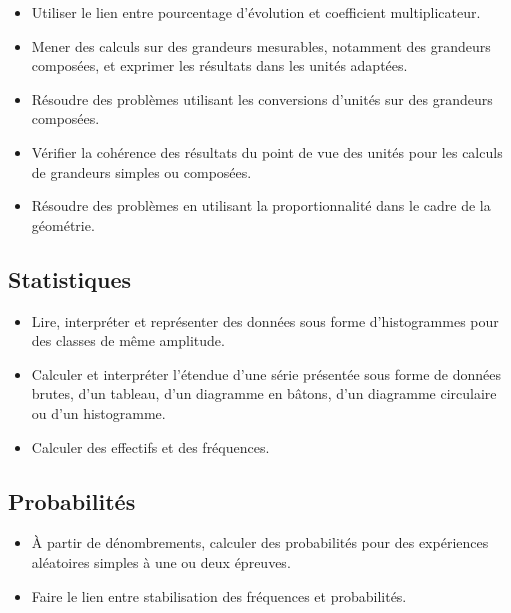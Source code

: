 \documentclass[a4paper,12pt,fleqn]{article}	
\begin{document}
\begin{itemize}
	\item {}Utiliser le lien entre pourcentage d’évolution et coefficient multiplicateur.
	\item {}Mener des calculs sur des grandeurs mesurables, notamment des grandeurs composées, et exprimer les résultats dans les unités adaptées.
	\item {}Résoudre des problèmes utilisant les conversions d’unités sur des grandeurs composées.
	\item {}Vérifier la cohérence des résultats du point de vue des unités pour les calculs de grandeurs simples ou composées.
	\item {}Résoudre des problèmes en utilisant la proportionnalité dans le cadre de la géométrie.
\end{itemize}

\subsection*{Statistiques}

\begin{itemize}
	\item {}Lire, interpréter et représenter des données sous forme d’histogrammes pour des classes de même amplitude.
	\item {}Calculer et interpréter l’étendue d’une série présentée sous forme de données brutes, d’un tableau, d’un diagramme en bâtons, d’un diagramme circulaire ou d’un histogramme.
	\item {}Calculer des effectifs et des fréquences.
\end{itemize}

\subsection*{Probabilités}

\begin{itemize}
	\item {}À partir de dénombrements, calculer des probabilités pour des expériences aléatoires simples à une ou deux épreuves.
	\item {}Faire le lien entre stabilisation des fréquences et probabilités.
\end{itemize}
	
\end{document}
